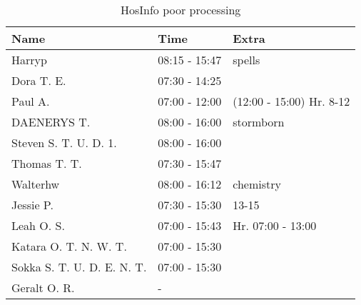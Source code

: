 \begin{table}[H]
    \centering
    \begin{tabular}{|l|l|l|}
        \hline
        \textbf{Name}              & \textbf{Time} & \textbf{Extra}           \\ \hline
        Harryp                     & 08:15 - 15:47 & spells                   \\ \hline
        Dora T. E.                 & 07:30 - 14:25 &                          \\ \hline
        Paul A.                    & 07:00 - 12:00 & (12:00 - 15:00) Hr. 8-12 \\ \hline
        DAENERYS T.                & 08:00 - 16:00 & stormborn                \\ \hline
        Steven S. T. U. D. 1.      & 08:00 - 16:00 &                          \\ \hline
        Thomas T. T.               & 07:30 - 15:47 &                          \\ \hline
        Walterhw                   & 08:00 - 16:12 & chemistry                \\ \hline
        Jessie P.                  & 07:30 - 15:30 & 13-15                    \\ \hline
        Leah O. S.                 & 07:00 - 15:43 & Hr. 07:00 - 13:00        \\ \hline
        Katara O. T. N. W. T.      & 07:00 - 15:30 &                          \\ \hline
        Sokka S. T. U. D. E. N. T. & 07:00 - 15:30 &                          \\ \hline
        Geralt O. R.               & -             &                          \\ \hline
    \end{tabular}
    \caption{HosInfo poor processing}
    \label{tab:HosInfo-poor-processing}
\end{table}

